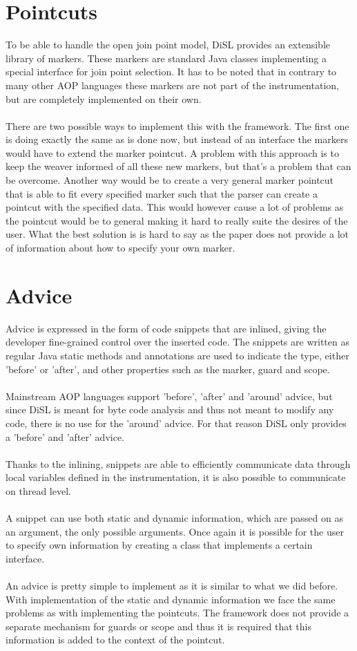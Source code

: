 \documentclass[a4paper]{report}
\begin{document}
\section{Pointcuts}
To be able to handle the open join point model, DiSL provides an extensible library of markers. These markers are standard Java classes implementing a special interface for join point selection. It has to be noted that in contrary to many other AOP languages these markers are not part of the instrumentation, but are completely implemented on their own.\\
\\
There are two possible ways to implement this with the framework. The first one is doing exactly the same as is done now, but instead of an interface the markers would have to extend the marker pointcut. A problem with this approach is to keep the weaver informed of all these new markers, but that's a problem that can be overcome. Another way would be to create a very general marker pointcut that is able to fit every specified marker such that the parser can create a pointcut with the specified data. This would however cause a lot of problems as the pointcut would be to general making it hard to really suite the desires of the user. What the best solution is is hard to say as the paper does not provide a lot of information about how to specify your own marker.

\section{Advice}
Advice is expressed in the form of code snippets that are inlined, giving the developer fine-grained control over the inserted code. The snippets are written as regular Java static methods and annotations are used to indicate the type, either 'before' or 'after', and other properties such as the marker, guard and scope.\\
\\
Mainstream AOP languages support 'before', 'after' and 'around' advice, but since DiSL is meant for byte code analysis and thus not meant to modify any code, there is no use for the 'around' advice. For that reason DiSL only provides a 'before' and 'after' advice.\\
\\
Thanks to the inlining, snippets are able to efficiently communicate data through local variables defined in the instrumentation, it is also possible to communicate on thread level.\\
\\
A snippet can use both static and dynamic information, which are passed on as an argument, the only possible arguments. Once again it is possible for the user to specify own information by creating a class that implements a certain interface.\\
\\
An advice is pretty simple to implement as it is similar to what we did before. With implementation of the static and dynamic information we face the same problems as with implementing the pointcuts. The framework does not provide a separate mechanism for guards or scope and thus it is required that this information is added to the context of the pointcut.
\end{document}
